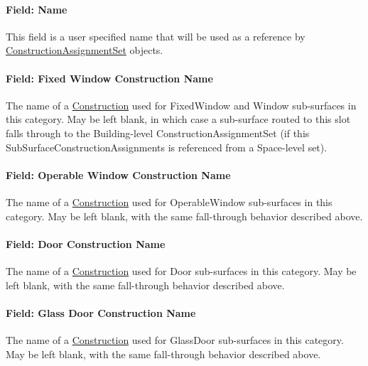 \paragraph{Field: Name}\label{subsurfaceconstructionassignments-field-name}

This field is a user specified name that will be used as a reference by \hyperref[constructionassignmentset]{ConstructionAssignmentSet} objects.

\paragraph{Field: Fixed Window Construction Name}\label{subsurfaceconstructionassignments-field-fixed-window-construction-name}

The name of a \hyperref[construction-000]{Construction} used for FixedWindow and Window sub-surfaces in this category. May be left blank, in which case a sub-surface routed to this slot falls through to the Building-level ConstructionAssignmentSet (if this SubSurfaceConstructionAssignments is referenced from a Space-level set).

\paragraph{Field: Operable Window Construction Name}\label{subsurfaceconstructionassignments-field-operable-window-construction-name}

The name of a \hyperref[construction-000]{Construction} used for OperableWindow sub-surfaces in this category. May be left blank, with the same fall-through behavior described above.

\paragraph{Field: Door Construction Name}\label{subsurfaceconstructionassignments-field-door-construction-name}

The name of a \hyperref[construction-000]{Construction} used for Door sub-surfaces in this category. May be left blank, with the same fall-through behavior described above.

\paragraph{Field: Glass Door Construction Name}\label{subsurfaceconstructionassignments-field-glass-door-construction-name}

The name of a \hyperref[construction-000]{Construction} used for GlassDoor sub-surfaces in this category. May be left blank, with the same fall-through behavior described above.

